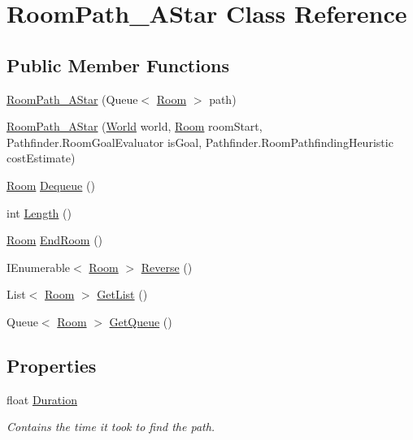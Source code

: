 \hypertarget{class_room_path___a_star}{}\section{Room\+Path\+\_\+\+A\+Star Class Reference}
\label{class_room_path___a_star}
\subsection*{Public Member Functions}
\begin{DoxyCompactItemize}
\item 
\hyperlink{class_room_path___a_star_a8f2c182f3cf40649f44a70047d825b63}{Room\+Path\+\_\+\+A\+Star} (Queue$<$ \hyperlink{class_project_porcupine_1_1_rooms_1_1_room}{Room} $>$ path)
\item 
\hyperlink{class_room_path___a_star_ad34e154127f30fc296a7e5a130e7a838}{Room\+Path\+\_\+\+A\+Star} (\hyperlink{class_world}{World} world, \hyperlink{class_project_porcupine_1_1_rooms_1_1_room}{Room} room\+Start, Pathfinder.\+Room\+Goal\+Evaluator is\+Goal, Pathfinder.\+Room\+Pathfinding\+Heuristic cost\+Estimate)
\item 
\hyperlink{class_project_porcupine_1_1_rooms_1_1_room}{Room} \hyperlink{class_room_path___a_star_aabed126d8b7afbc72f1817a8360d5829}{Dequeue} ()
\item 
int \hyperlink{class_room_path___a_star_a51c04c59c6facda1cc782e2eadb9f980}{Length} ()
\item 
\hyperlink{class_project_porcupine_1_1_rooms_1_1_room}{Room} \hyperlink{class_room_path___a_star_a105a63aa51bd48c7f50196f530421c9b}{End\+Room} ()
\item 
I\+Enumerable$<$ \hyperlink{class_project_porcupine_1_1_rooms_1_1_room}{Room} $>$ \hyperlink{class_room_path___a_star_ab8816fde9809dd35893cbea92158ce8d}{Reverse} ()
\item 
List$<$ \hyperlink{class_project_porcupine_1_1_rooms_1_1_room}{Room} $>$ \hyperlink{class_room_path___a_star_a32701223a03daa4db393811bc5709364}{Get\+List} ()
\item 
Queue$<$ \hyperlink{class_project_porcupine_1_1_rooms_1_1_room}{Room} $>$ \hyperlink{class_room_path___a_star_a45425c3fec23a8687df1d0272f6117e6}{Get\+Queue} ()
\end{DoxyCompactItemize}
\subsection*{Properties}
\begin{DoxyCompactItemize}
\item 
float \hyperlink{class_room_path___a_star_a6acd0da2e2db3493a3f094caf2e88e0a}{Duration}
\begin{DoxyCompactList}\small\item\em Contains the time it took to find the path. \end{DoxyCompactList}\end{DoxyCompactItemize}


